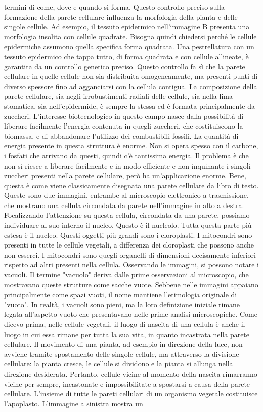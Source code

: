 \documentclass[11pt, a4paper]{article}
\begin{document}
\begin{spacing}{1.15}
termini di come, dove e quando si forma. Questo controllo preciso sulla formazione della parete cellulare influenza la morfologia della pianta e delle singole cellule. Ad esempio, il tessuto epidermico nell'immagine B presenta una morfologia insolita con cellule quadrate. Bisogna quindi chiedersi perché le cellule epidermiche assumono quella specifica forma quadrata. Una pestrellatura con un tessuto epidermico che tappa tutto, di forma quadrata e con cellule allineate, è garantita da un controllo genetico preciso. Questo controllo fa sì che la parete cellulare in quelle cellule non sia distribuita omogeneamente, ma presenti punti di diverso spessore fino ad agganciarsi con la cellula contigua. La composizione della parete cellulare, sia negli irrobustimenti radiali delle cellule, sia nella lima stomatica, sia nell'epidermide, è sempre la stessa ed è formata principalmente da zuccheri. L'interesse biotecnologico in questo campo nasce dalla possibilità di liberare facilmente l'energia contenuta in quegli zuccheri, che costituiscono la biomassa, e di abbandonare l'utilizzo dei combustibili fossili. La quantità di energia presente in questa struttura è enorme. Non si opera spesso con il carbone, i fosfati che arrivano da questi, quindi c'è tantissima energia. Il problema è che non si riesce a liberare facilmente e in modo efficiente e non inquinante i singoli zuccheri presenti nella parete cellulare, però ha un'applicazione enorme. Bene, questa è come viene classicamente disegnata una parete cellulare da libro di testo. Queste sono due immagini, entrambe al microscopio elettronico a trasmissione, che mostrano una cellula circondata da parete nell'immagine in alto a destra. Focalizzando l'attenzione su questa cellula, circondata da una parete, possiamo individuare al suo interno il nucleo. Questo è il nucleolo. Tutta questa parte più estesa è il nucleo. Questi oggetti più grandi sono i cloroplasti. I mitocondri sono presenti in tutte le cellule vegetali, a differenza dei cloroplasti che possono anche non esserci. I mitocondri sono quegli organelli di dimensioni decisamente inferiori rispetto ad altri presenti nella cellula. Osservando le immagini, si possono notare i vacuoli. Il termine "vacuolo" deriva dalle prime osservazioni al microscopio, che mostravano queste strutture come sacche vuote. Sebbene nelle immagini appaiano principalmente come spazi vuoti, il nome mantiene l'etimologia originale di "vuoto". In realtà, i vacuoli sono pieni, ma la loro definizione iniziale rimane legata all'aspetto vuoto che presentavano nelle prime analisi microscopiche. Come dicevo prima, nelle cellule vegetali, il luogo di nascita di una cellula è anche il luogo in cui essa rimane per tutta la sua vita, in quanto incastrata nella parete cellulare. Il movimento di una pianta, ad esempio in direzione della luce, non avviene tramite spostamento delle singole cellule, ma attraverso la divisione cellulare: la pianta cresce, le cellule si dividono e la pianta si allunga nella direzione desiderata. Pertanto, cellule vicine al momento della nascita rimarranno vicine per sempre, incastonate e impossibilitate a spostarsi a causa della parete cellulare.  L'insieme di tutte le pareti cellulari di un organismo vegetale costituisce l'apoplasto. L'immagine a sinistra mostra un 
\end{spacing}
\end{document}
